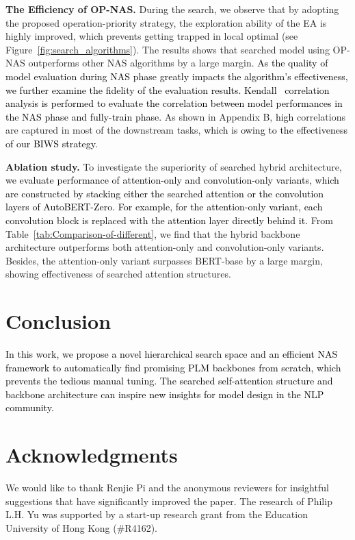 \documentclass[letterpaper]{article} \usepackage{aaai22}  \usepackage{times}  \usepackage{helvet}  \usepackage{courier}  \usepackage[hyphens]{url}  \usepackage{graphicx} \urlstyle{rm} \def\UrlFont{\rm}  \usepackage{natbib}  \usepackage{caption} \DeclareCaptionStyle{ruled}{labelfont=normalfont,labelsep=colon,strut=off} \frenchspacing  \setlength{\pdfpagewidth}{8.5in}  \setlength{\pdfpageheight}{11in}  \usepackage{algorithm}
\newcommand{\prj}[1]{\textcolor{black}{#1}} \newcommand{\prjj}[1]{\textcolor{black}{#1}} \newcommand{\jhh}[1]{\textcolor{black}{#1}} \newcommand{\jh}[1]{\textcolor{black}{#1}} \newcommand{\sh}[1]{\textcolor{black}{#1}} \usepackage{multirow}
\begin{document}
\textbf{The Efficiency of OP-NAS.}  During the search, we observe that by adopting the proposed operation-priority strategy, the exploration ability of the EA is highly improved, which prevents getting trapped in local optimal (see Figure~\ref{fig:search_algorithms}). The results shows that searched model using OP-NAS outperforms other NAS algorithms by a large margin.
\prj{As the quality of model evaluation during NAS phase greatly impacts the algorithm's effectiveness, we further examine the fidelity of the evaluation results. Kendall~\citep{kendall} correlation analysis is performed to evaluate the correlation between model performances in the NAS phase and fully-train phase.} As shown in Appendix B, \prj{high}
correlations are captured in most of the downstream tasks,
\prj{which is owing to the effectiveness of our BIWS strategy}.



\textbf{Ablation study.} To investigate the superiority of searched hybrid architecture, \prj{
we evaluate performance of attention-only and convolution-only variants, which are constructed by stacking either the searched attention or the convolution layers of AutoBERT-Zero.} 
\prj{For example, for the attention-only variant, each convolution block is replaced with the attention layer directly behind it.} From Table~\ref{tab:Comparison-of-different}, we find that the hybrid backbone architecture outperforms both attention-only and convolution-only variants. Besides, the attention-only variant surpasses BERT-base by a large margin, showing effectiveness of searched attention structures. 






\vspace{-2mm}
\section{Conclusion}\label{sec:conclusion}
\prj{In this work, we propose a novel hierarchical search space and an efficient NAS framework to automatically find promising PLM backbones from scratch, which prevents the tedious manual tuning.  The searched self-attention structure and backbone architecture can inspire new insights for model design in the NLP community. 
}




\section*{Acknowledgments}
We would like to thank Renjie Pi and the anonymous reviewers for insightful suggestions that have significantly improved the paper. 
The research of Philip L.H. Yu was supported by a start-up research grant from the Education University of Hong Kong (\#R4162).
\end{document}
